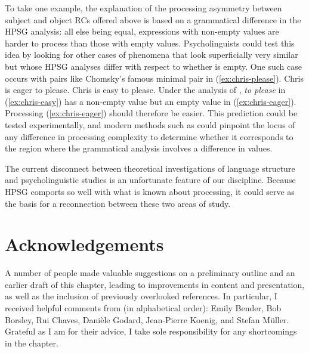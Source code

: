 \documentclass[output=paper
                ,modfonts
                ,nonflat
	        ,collection
	        ,collectionchapter
	        ,collectiontoclongg
 	        ,biblatex
                ,babelshorthands
                ,newtxmath
                ,draftmode
                ,colorlinks, citecolor=brown
]{./langsci/langscibook}
\begin{document}
To take one example, the explanation of the processing asymmetry between subject and object RCs
offered above is based on a grammatical difference in the HPSG analysis:  all else being equal,
expressions with non-empty \isi{\slasch} values are harder to process than those with empty \slasch values.  Psycholinguists could test this idea by looking for other cases of phenomena that look superficially very similar but whose HPSG analyses differ with respect to whether \slasch is empty.  One such case occurs with pairs like  Chomsky's famous minimal pair in (\ref{ex:chris-please}).
\eal\label{ex:chris-please}
\ex Chris is eager to please.\label{ex:chris-eager}
\ex Chris is easy to please.\label{ex:chris-easy}
\zl
Under the analysis of \citet{ps2}, \emph{to please} in (\ref{ex:chris-easy}) has a non-empty \isi{\slasch} value but an empty \slasch value in (\ref{ex:chris-eager}).  Processing (\ref{ex:chris-eager}) should therefore be easier.  This prediction could be tested experimentally, and modern methods such as  could pinpoint the locus of any difference in processing complexity to determine whether it corresponds to the region where the grammatical analysis involves a difference in \isi{\slasch} values.

The current disconnect between theoretical investigations of language structure and psycholinguistic studies is an unfortunate feature of our discipline.  Because HPSG comports so well with what is known about processing, it could serve as the basis for a reconnection between these two areas of study.

\section*{Acknowledgements}

A number of people made valuable suggestions on a preliminary outline and an earlier draft of this
chapter, leading to improvements in content and presentation, as well as the inclusion of previously
overlooked references.  In particular, I received helpful comments from (in alphabetical order):
Emily Bender, Bob Borsley, Rui Chaves, Danièle Godard, Jean-Pierre Koenig, and Stefan Müller.
Grateful as I am for their advice, I take sole responsibility for any shortcomings in the chapter. 

{\sloppy
\printbibliography[heading=subbibliography,notkeyword=this] 
}
\end{document}
